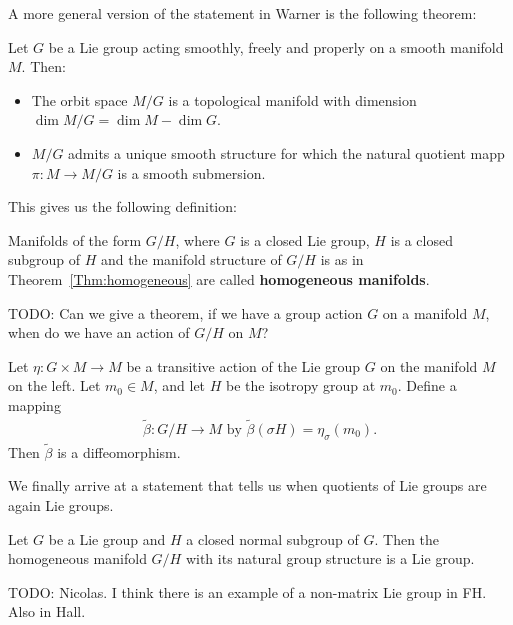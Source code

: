 A more general version of the statement in Warner is the following theorem:
\begin{theorem}
Let $G$ be a Lie group acting smoothly, freely and properly on a smooth manifold $M$. Then:
\begin{itemize}
\item The orbit space $M/G$ is a topological manifold with dimension $\dim M/G = \dim M - \dim G$.
\item $M/G$ admits a unique smooth structure for which the natural quotient mapp $\pi \colon M \to M/G$ is a smooth submersion.
\end{itemize}
\end{theorem}
This gives us the following definition:
\begin{definition} 
\textup{\cite[3.59]{Warner1983}}
Manifolds of the form $G/H$, where $G$ is a closed Lie group, $H$ is a closed subgroup of $H$ and the manifold structure of $G/H$ is as in Theorem~\ref{Thm:homogeneous} are called \textbf{homogeneous manifolds}.
\end{definition}

TODO: Can we give a theorem, if we have a group action $G$ on a manifold $M$, when do we have an action of $G/H$ on $M$?

\begin{theorem}
\textup{\cite[3.62]{Warner1983}}
Let $\eta \colon G \times M \to M$ be a transitive action of the Lie group $G$ on the manifold $M$ on the left. Let $m_0 \in M$, and let $H$ be the isotropy group at $m_0$. Define a mapping
\begin{align*}
\tilde{\beta} \colon G/H \to M \text{ by } \tilde{\beta}(\sigma H) = \eta_{\sigma}(m_0).
\end{align*}
Then $\tilde{\beta}$ is a diffeomorphism.
\end{theorem}
We finally arrive at a statement that tells us when quotients of Lie groups are again Lie groups.
\begin{theorem}
Let $G$ be a Lie group and $H$ a closed normal subgroup of $G$. Then the homogeneous manifold $G/H$ with its natural group structure is a Lie group.
\end{theorem}

TODO: Nicolas. I think there is an example of a non-matrix Lie group in FH. Also in Hall.

